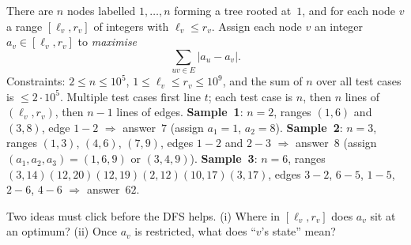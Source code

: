 \begin{problemstatement}
There are $n$ nodes labelled $1,\dots,n$ forming a tree rooted at~$1$, and
for each node $v$ a range $[\ell_v,r_v]$ of integers with
$\ell_v\le r_v$. Assign each node $v$ an integer $a_v\in[\ell_v,r_v]$ to
\emph{maximise}
\[
  \sum_{uv\in E} |a_u - a_v| .
\]
Constraints: $2\le n\le 10^{5}$, $1\le \ell_v\le r_v\le 10^{9}$, and the
sum of $n$ over all test cases is $\le 2\cdot 10^{5}$. Multiple test cases
first line $t$; each test case is $n$, then $n$ lines of $(\ell_v,r_v)$,
then $n-1$ lines of edges. \textbf{Sample~1}: $n=2$, ranges
$(1,6)$ and $(3,8)$, edge $1\!-\!2$ $\Rightarrow$ answer~$7$ (assign
$a_1=1$, $a_2=8$). \textbf{Sample~2}: $n=3$, ranges $(1,3)$, $(4,6)$,
$(7,9)$, edges $1\!-\!2$ and $2\!-\!3$ $\Rightarrow$ answer~$8$ (assign
$(a_1,a_2,a_3)=(1,6,9)$ or $(3,4,9)$). \textbf{Sample~3}: $n=6$, ranges
$(3,14)(12,20)(12,19)(2,12)(10,17)(3,17)$, edges $3\!-\!2$, $6\!-\!5$,
$1\!-\!5$, $2\!-\!6$, $4\!-\!6$ $\Rightarrow$ answer~$62$.
\end{problemstatement}

\begin{attemptgate}
Two ideas must click before the DFS helps. (i) Where in $[\ell_v,r_v]$ does
$a_v$ sit at an optimum? (ii) Once $a_v$ is restricted, what does ``$v$'s
state'' mean?
\end{attemptgate}

